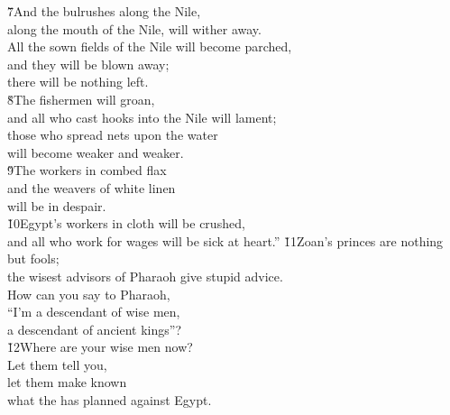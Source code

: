 \begin{poetry}
\poeml \v{7}And the bulrushes along the Nile, \\
\poemll    along the mouth of the Nile, will wither away. \\
\poeml All the sown fields of the Nile will become parched, \\
\poemll    and they will be blown away; \\
\poemlll       there will be nothing left. \\
\poeml \v{8}The fishermen will groan, \\
\poemll    and all who cast hooks into the Nile will lament; \\
\poeml those who spread nets upon the water \\
\poemll    will become weaker and weaker. \\
\poeml \v{9}The workers in combed flax \\
\poemll    and the weavers of white linen \\
\poemlll       will be in despair. \\
\poeml \v{10}Egypt's workers in cloth will be crushed, \\
\poemll    and all who work for wages will be sick at heart.''
\poeml \v{11}Zoan's princes are nothing but fools; \\
\poemll    the wisest advisors of Pharaoh give stupid advice. \\
\poeml How can you say to Pharaoh, \\
\poemll    ``I'm a descendant of wise men, \\
\poemlll       a descendant of ancient kings''? \\
\poeml \v{12}Where are your wise men now? \\
\poemll    Let them tell you, \\
\poeml let them make known \\
\poemll    what the  has planned against Egypt. \\

\end{poetry}
